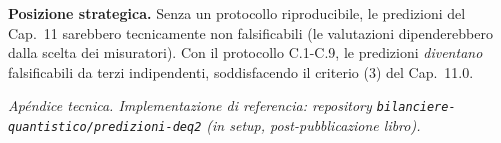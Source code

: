 \Hypoth{} \textbf{Posizione strategica.} Senza un protocollo
riproducibile, le predizioni del Cap.~11 sarebbero tecnicamente non
falsificabili (le valutazioni dipenderebbero dalla scelta dei
misuratori). Con il protocollo C.1-C.9, le predizioni \emph{diventano}
falsificabili da terzi indipendenti, soddisfacendo il criterio (3) del
Cap.~11.0.



\emph{Apéndice tecnica. Implementazione di referencia: repository
\texttt{bilanciere-quantistico/predizioni-deq2} (in setup,
post-pubblicazione libro).}
